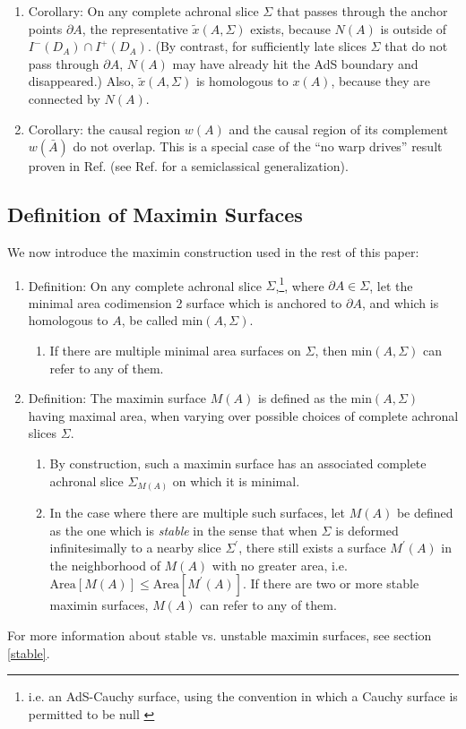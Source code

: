 \documentclass{article}
\begin{document}
\begin{enumerate}[resume]
\begin{enumerate}
	\item \label{repex} Corollary: On any complete achronal slice $\Sigma$ that passes through the anchor points $\partial A$, the representative $\tilde{x}(A,\Sigma)$ exists, because $N(A)$ is outside of $I^-(D_A) \cap I^+(D_A)$.  (By contrast, for sufficiently late slices $\Sigma$ that do not pass through $\partial A$, $N(A)$ may have already hit the AdS boundary and disappeared.)  Also, $\tilde{x}(A,\Sigma)$ is homologous to $x(A)$, because they are connected by $N(A)$.
	\item Corollary: the causal region $w(A)$ and the causal region of its complement $w(\bar{A})$ do not overlap.  This is a special case of the ``no warp drives'' result proven in Ref. \cite{GW00} (see Ref. \cite{sing} for a semiclassical generalization).
	\end{enumerate}
\end{enumerate}

\subsection{Definition of Maximin Surfaces}\label{def}

We now introduce the maximin construction used in the rest of this paper:

\begin{enumerate}[resume]
\item Definition: On any complete achronal slice $\Sigma$,\footnote{i.e. an AdS-Cauchy surface, using the convention in which a Cauchy surface is permitted to be null \cite{geroch70}}, where $\partial A \in \Sigma$, let the minimal area codimension 2 surface which is anchored to $\partial A$, and which is homologous to $A$, be called $\mathrm{min}(A,\Sigma)$.
	\begin{enumerate}
	\item If there are multiple minimal area surfaces on $\Sigma$, then $\mathrm{min}(A,\Sigma)$ can refer to any of them.
	\end{enumerate}

\item \label{Mdef} Definition: The maximin surface $M(A)$ is defined as the $\mathrm{min}(A,\Sigma)$ having maximal area, when varying over possible choices of complete achronal slices $\Sigma$.
	\begin{enumerate}
	\item By construction, such a maximin surface has an associated complete achronal slice $\Sigma_{M(A)}$ on which it is minimal.
	\item \label{sdef} In the case where there are multiple such surfaces, let $M(A)$ be defined as the one which is \emph{stable} in the sense that when $\Sigma$ is deformed infinitesimally to a nearby slice $\Sigma^\prime$, there still exists a surface $M^\prime(A)$ in the neighborhood of $M(A)$ with no greater area, i.e. $\mathrm{Area}[M(A)] \le \mathrm{Area}[M^\prime(A)]$.  If there are two or more stable maximin surfaces, $M(A)$ can refer to any of them.
	\end{enumerate}
\end{enumerate}
For more information about stable vs. unstable maximin surfaces, see section \ref{stable}.
\end{document}
